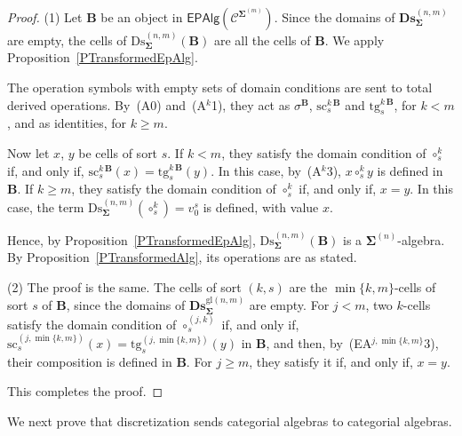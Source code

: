 \documentclass[a4paper, reqno
]{amsart}
\newcommand{\sig}[1]{\mathbf{#1}}             %
\newcommand{\spec}[1]{\boldsymbol{\mathcal{#1}}} %
\newcommand{\gl}{\mathrm{gl}}                %
\newcommand{\src}{\mathrm{sc}}
\newcommand{\tgt}{\mathrm{tg}}
\newcommand{\Ds}{\mathrm{Ds}}
\newcommand{\bDs}{\mathbf{Ds}}
\theoremstyle{plain}
\theoremstyle{definition}
\begin{document}
\begin{proof}
(1) Let $\mathbf{B}$ be an object in $\mathsf{EPAlg}(\spec{C}^{\sig{\Sigma}^{(m)}})$.
Since the domains of $\bDs^{(n,m)}_{\sig{\Sigma}}$ are empty, the cells of $\Ds^{(n,m)}_{\sig{\Sigma}}(\mathbf{B})$ are all the cells of $\mathbf{B}$.
We apply Proposition~\ref{PTransformedEpAlg}.

The operation symbols with empty sets of domain conditions are sent to total derived operations.
By~(A0) and~(A$^{k}$1), they act as $\sigma^{\mathbf{B}}$, $\src^{k\,\mathbf{B}}_{s}$ and $\tgt^{k\,\mathbf{B}}_{s}$, for $k<m$, and as identities, for $k\geq m$.

Now let $x$, $y$ be cells of sort $s$.
If $k<m$, they satisfy the domain condition of $\circ^{k}_{s}$ if, and only if, $\src^{k\,\mathbf{B}}_{s}(x)=\tgt^{k\,\mathbf{B}}_{s}(y)$.
In this case, by~(A$^{k}$3), $x\circ^{k}_{s}y$ is defined in $\mathbf{B}$.
If $k\geq m$, they satisfy the domain condition of $\circ^{k}_{s}$ if, and only if, $x=y$.
In this case, the term $\Ds^{(n,m)}_{\sig{\Sigma}}(\circ^{k}_{s})=v^{s}_{0}$ is defined, with value $x$.

Hence, by Proposition~\ref{PTransformedEpAlg}, $\Ds^{(n,m)}_{\sig{\Sigma}}(\mathbf{B})$ is a $\sig{\Sigma}^{(n)}$-algebra.
By Proposition~\ref{PTransformedAlg}, its operations are as stated.

(2) The proof is the same.
The cells of sort $(k,s)$ are the $\min\{k,m\}$-cells of sort $s$ of $\mathbf{B}$, since the domains of $\bDs^{\gl(n,m)}_{\sig{\Sigma}}$ are empty.
For $j<m$, two $k$-cells satisfy the domain condition of $\circ^{(j,k)}_{s}$ if, and only if, $\src^{(j,\min\{k,m\})}_{s}(x)=\tgt^{(j,\min\{k,m\})}_{s}(y)$ in $\mathbf{B}$, and then, by~(EA$^{j,\min\{k,m\}}$3), their composition is defined in $\mathbf{B}$.
For $j\geq m$, they satisfy it if, and only if, $x=y$.

This completes the proof.
\end{proof}

We next prove that discretization sends categorial algebras to categorial algebras.
\end{document}
